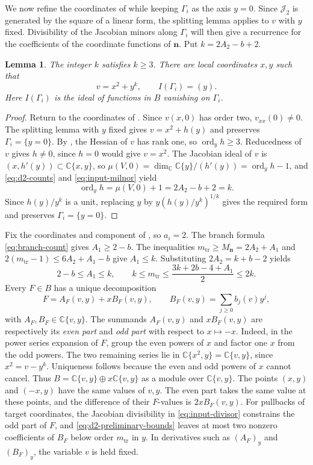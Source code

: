\documentclass[11pt,letterpaper]{article}
\numberwithin{equation}{section}
\newtheorem{lemma}[lemma]{Lemma}
\theoremstyle{remark}
\theoremstyle{plain}
\newcommand{\C}{\mathbb{C}}
\newcommand{\ord}{\operatorname{ord}}
\begin{document}
We now refine the coordinates of  while keeping $\Gamma_i$
as the axis $y=0$.  Since $\mathcal J_2$ is generated by the square of
a linear form, the splitting lemma applies to $v$ with $y$ fixed.  Divisibility of the
Jacobian minors along $\Gamma_i$ will then give a recurrence for
the coefficients of the coordinate functions of $\boldsymbol n$.  Put $k=2A_2-b+2$.

\begin{lemma}
\label{lem:d2-morse}
The integer $k$ satisfies $k\geq3$.  There are local coordinates $x,y$
such that
\[
 v=x^2+y^k,\qquad I(\Gamma_i)=(y).
\]
Here $I(\Gamma_i)$ is the ideal of functions in $B$ vanishing on $\Gamma_i$.
\end{lemma}

\begin{proof}
Return to the coordinates of .
Since $v(x,0)$ has order two, $v_{xx}(0)\neq0$.
The splitting lemma with $y$ fixed gives $v=x^2+h(y)$ and
preserves $\Gamma_i=\{y=0\}$.  By ,
the Hessian of $v$ has rank one, so $\ord_y h\geq3$.
Reducedness of $v$ gives $h\neq0$, since $h=0$ would give
$v=x^2$.  The Jacobian ideal of $v$ is $(x,h'(y))\subset\C\{x,y\}$,
so $\mu(V,0)=\dim_\C\C\{y\}/(h'(y))=\ord_yh-1$, and
\eqref{eq:d2-counts} and \eqref{eq:input-milnor} yield
\[
 \ord_yh=\mu(V,0)+1=2A_2-b+2=k.
\]
Since $h(y)/y^k$ is a unit, replacing $y$ by
$y(h(y)/y^k)^{1/k}$ gives the required form and preserves
$\Gamma_i=\{y=0\}$.
\end{proof}

Fix the coordinates and component of , so
$a_i=2$.
The branch formula \eqref{eq:branch-count} gives $A_1\geq2-b$.
The inequalities $m_{\mathrm{tr}}\geq M_{\boldsymbol n}=2A_2+A_1$
and $2(m_{\mathrm{tr}}-1)\leq6A_2+A_1-b$ give $A_1\leq k$.
Substituting $2A_2=k+b-2$ yields
\begin{equation}
 2-b\leq A_1\leq k,\qquad
 k\leq m_{\mathrm{tr}}
 \leq\frac{3k+2b-4+A_1}{2}\leq2k.
 \label{eq:d2-preliminary-bounds}
\end{equation}
Every $F\in B$ has a unique decomposition
\[
 F=A_F(v,y)+xB_F(v,y),\qquad
 B_F(v,y)=\sum_{j\geq0}b_j(v)y^j,
\]
with $A_F,B_F\in\C\{v,y\}$.  The summands $A_F(v,y)$ and
$xB_F(v,y)$ are respectively its \emph{even part} and
\emph{odd part} with respect to $x\mapsto-x$.
Indeed, in the power series expansion of $F$, group the even powers of $x$
and factor one $x$ from the odd powers.  The two remaining series lie in
$\C\{x^2,y\}=\C\{v,y\}$, since $x^2=v-y^k$.
Uniqueness follows because the even and odd powers of $x$
cannot cancel.  Thus
$B=\C\{v,y\}\oplus x\C\{v,y\}$ as a module over $\C\{v,y\}$.
The points $(x,y)$ and $(-x,y)$ have the same values of $v,y$.
The even part takes the same value at these points, and the difference
of their $F$-values is $2xB_F(v,y)$.  For pullbacks of target coordinates,
the Jacobian divisibility in \eqref{eq:input-divisor}
constrains the odd part of $F$, and \eqref{eq:d2-preliminary-bounds}
leaves at most two nonzero coefficients of $B_F$ below order $m_{\mathrm{tr}}$ in $y$.
In derivatives such as $(A_F)_y$ and $(B_F)_y$, the variable $v$
is held fixed.
\end{document}

